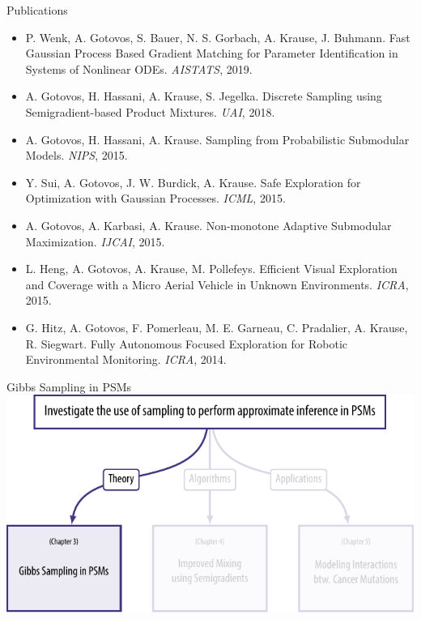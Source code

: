 \documentclass[mathserif]{beamer}
\begin{document}
\begin{frame}{Publications}
\vspace{0.5em}
\small
\begin{itemize}
\item P. Wenk, A. Gotovos, S. Bauer, N. S. Gorbach, A. Krause, J. Buhmann. Fast Gaussian Process Based Gradient Matching for Parameter Identification in Systems of Nonlinear ODEs. \emph{AISTATS}, 2019.
\vspace{0.5em}
\item {\color{col1dark}A. Gotovos, H. Hassani, A. Krause, S. Jegelka. Discrete Sampling using Semigradient-based Product Mixtures. \emph{UAI}, 2018.}
\vspace{0.5em}
\item {\color{col1dark}A. Gotovos, H. Hassani, A. Krause. Sampling from Probabilistic Submodular Models. \emph{NIPS}, 2015.}
\vspace{0.5em}
\item Y. Sui, A. Gotovos, J. W. Burdick, A. Krause. Safe Exploration for Optimization with Gaussian Processes. \emph{ICML}, 2015.
\vspace{0.5em}
\item A. Gotovos, A. Karbasi, A. Krause. Non-monotone Adaptive Submodular Maximization. \emph{IJCAI}, 2015.
\vspace{0.5em}
\item L. Heng, A. Gotovos, A. Krause, M. Pollefeys. Efficient Visual Exploration and Coverage with a Micro Aerial Vehicle in Unknown Environments. \emph{ICRA}, 2015.
\vspace{0.5em}
\item G. Hitz, A. Gotovos, F. Pomerleau, M. E. Garneau, C. Pradalier, A. Krause, R. Siegwart. Fully Autonomous Focused Exploration for Robotic Environmental Monitoring. \emph{ICRA}, 2014.
\end{itemize}
\end{frame}

\begin{frame}{Gibbs Sampling in PSMs}
\vspace{1em}
\centering
\includegraphics[width=\textwidth]{figures/chapters1.pdf}
\end{frame}
\end{document}
